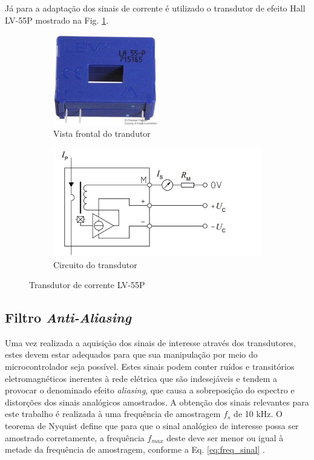 Já para a adaptação dos sinais de corrente é utilizado o transdutor de efeito Hall LV-55P mostrado na Fig. \ref{fig:transdutor_corrente}.

\begin{figure}
	\centering
	\begin{subfigure}[b]{0.4\textwidth}
		\centering
		\includegraphics[width=0.5\textwidth]{figuras/Transdutor_Corrente.jpg}
		\caption{Vista frontal do trandutor}
	\end{subfigure}
	\begin{subfigure}[b]{0.4\textwidth}
		\includegraphics[width=\textwidth]{figuras/Transdutor_Corrente_Circuito.jpg}
		\caption{Circuito do transdutor}
	\end{subfigure}
	\caption{Transdutor de corrente LV-55P}\label{fig:transdutor_corrente}
\end{figure}

\subsection{Filtro \textit{Anti-Aliasing}}

	Uma vez realizada a aquisição dos sinais de interesse através dos transdutores, estes devem estar adequados para que sua manipulação por meio do microcontrolador seja possível.
	Estes sinais podem conter ruídos e transitórios eletromagnéticos inerentes à rede elétrica que são indesejáveis e tendem a provocar o denominado efeito \textit{aliasing}, que causa a sobreposição do espectro e distorções dos sinais analógicos amostrados.
	A obtenção dos sinais relevantes para este trabalho é realizada à uma frequência de amostragem $f_s$ de 10 kHz. O teorema de Nyquist define que para que o sinal analógico de interesse possa ser amostrado corretamente, a frequência $f_{max}$ deste deve ser menor ou igual à metade da frequência de amostragem, conforme a Eq. \ref{eq:freq_sinal} \cite{alanoppenheim2009}.

